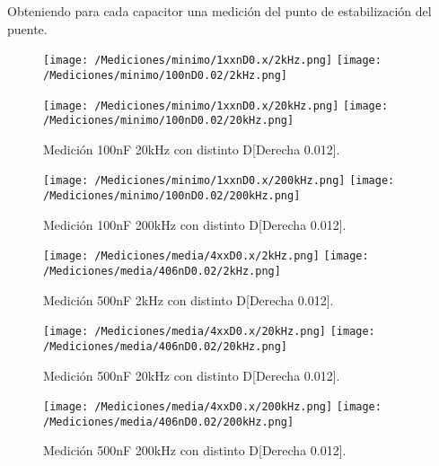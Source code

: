 Obteniendo para cada capacitor una medición del punto de estabilización del puente.
\begin{figure}[H]
	\centering
	\texttt{[image: /Mediciones/minimo/1xxnD0.x/2kHz.png]}
	\texttt{[image: /Mediciones/minimo/100nD0.02/2kHz.png]}
	\label{fig:fcon}
\end{figure}
\begin{figure}[H]
	\centering
	\texttt{[image: /Mediciones/minimo/1xxnD0.x/20kHz.png]}
	\texttt{[image: /Mediciones/minimo/100nD0.02/20kHz.png]}
\caption{Medición 100nF 20kHz con distinto D[Derecha 0.012].}
	\label{fig:fcon}
\end{figure}
\begin{figure}[H]
	\centering
	\texttt{[image: /Mediciones/minimo/1xxnD0.x/200kHz.png]}
	\texttt{[image: /Mediciones/minimo/100nD0.02/200kHz.png]}
\caption{Medición 100nF 200kHz con distinto D[Derecha 0.012].}
	\label{fig:fcon}
\end{figure}
\begin{figure}[H]
	\centering
	\texttt{[image: /Mediciones/media/4xxD0.x/2kHz.png]}
	\texttt{[image: /Mediciones/media/406nD0.02/2kHz.png]}
\caption{Medición 500nF 2kHz con distinto D[Derecha 0.012].}
	\label{fig:fcon}
\end{figure}
\begin{figure}[H]
	\centering
	\texttt{[image: /Mediciones/media/4xxD0.x/20kHz.png]}
	\texttt{[image: /Mediciones/media/406nD0.02/20kHz.png]}
\caption{Medición 500nF 20kHz con distinto D[Derecha 0.012].}
	\label{fig:fcon}
\end{figure}
\begin{figure}[H]
	\centering
	\texttt{[image: /Mediciones/media/4xxD0.x/200kHz.png]}
	\texttt{[image: /Mediciones/media/406nD0.02/200kHz.png]}
\caption{Medición 500nF 200kHz con distinto D[Derecha 0.012].}
	\label{fig:fcon}
\end{figure}
